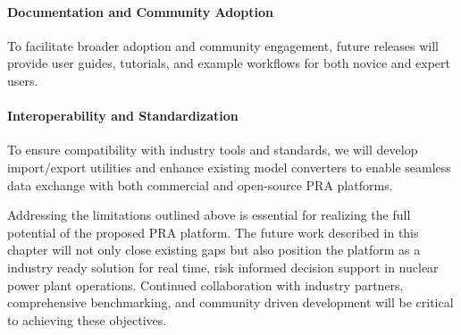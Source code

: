 \paragraph{Documentation and Community Adoption}

To facilitate broader adoption and community engagement, future releases will provide user guides, tutorials, and example workflows for both novice and expert users.

\paragraph{Interoperability and Standardization}

To ensure compatibility with industry tools and standards, we will develop import/export utilities and enhance existing model converters to enable seamless data exchange with both commercial and open-source PRA platforms.

Addressing the limitations outlined above is essential for realizing the full potential of the proposed PRA platform. The future work described in this chapter will not only close existing gaps but also position the platform as a industry ready solution for real time, risk informed decision support in nuclear power plant operations. Continued collaboration with industry partners, comprehensive benchmarking, and community driven development will be critical to achieving these objectives.

\begin{comment}
\section{Adaptive Scheduling for Real-Time PRA}
\section{Advanced Uncertainty Propagation}
\section{Variance Reduction Techniques}
\section{Integration with Industry Tools and Standards}
\end{comment}